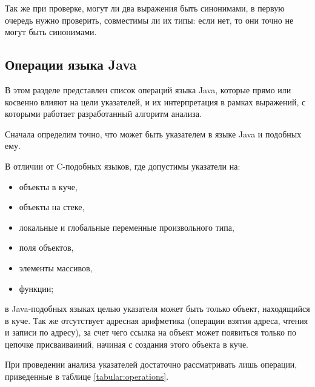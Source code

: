 \documentclass[14pt,titlepage]{extarticle}
\begin{document}
        Так же при проверке, могут ли два выражения быть синонимами, в первую
        очередь нужно проверить, совместимы ли их типы: если нет, то они точно не
        могут быть синонимами.

    \subsection{Операции языка Java}
      \label{section:operations}

      В этом разделе представлен список операций языка Java, которые прямо или
      косвенно влияют на цели указателей, и их интерпретация в рамках
      выражений, с которыми работает разработанный алгоритм анализа.

      Сначала определим точно, что может быть указателем в языке Java и
      подобных ему.

      В отличии от C-подобных языков, где допустимы указатели на:
      \begin{itemize}
        \item объекты в куче,
        \item объекты на стеке,
        \item локальные и глобальные переменные произвольного типа,
        \item поля объектов,
        \item элементы массивов,
        \item функции;
      \end{itemize}
      в Java-подобных языках целью указателя может быть только объект,
      находящийся в куче. Так же отсутствует адресная арифметика (операции
      взятия адреса, чтения и записи по адресу), за счет чего ссылка на объект
      может появиться только по цепочке присваиваиний, начиная с создания этого
      объекта в куче.

      При проведении анализа указателей достаточно рассматривать лишь
      операции, приведенные в таблице \ref{tabular:operations}.
\end{document}
